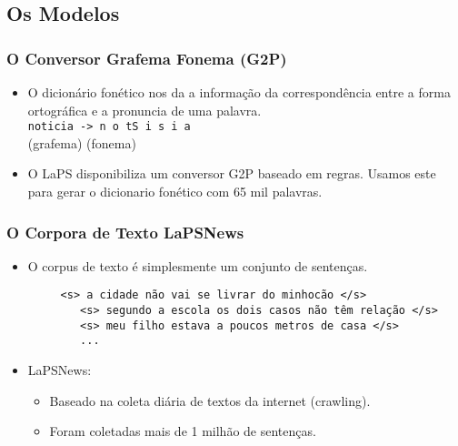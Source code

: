 \documentclass{beamer}
\begin{document}
\subsection{Os Modelos}
\begin{frame}
   \frametitle{O Conversor Grafema Fonema (G2P)}
   \begin{itemize}
      \item O dicionário fonético nos da a informação da correspondência
      entre a forma ortográfica e a pronuncia de uma palavra.\\
      {\centering \Large \texttt{noticia ->  n o tS i s i a}\\}
      \hspace{40pt} (grafema) \hspace{65pt} (fonema)\\[5pt]
   \end{itemize}
   \begin{itemize}
      \pause
      \item O LaPS disponibiliza um conversor G2P baseado em regras. Usamos
      este para gerar o dicionario fonético com 65 mil palavras.
   \end{itemize}
\end{frame}


\begin{frame}[fragile]
   \frametitle{O Corpora de Texto LaPSNews}
   \begin{itemize}
      \item O corpus de texto é simplesmente um conjunto de sentenças.
      {\footnotesize
	 \begin{verbatim}
	 <s> a cidade não vai se livrar do minhocão </s>
	    <s> segundo a escola os dois casos não têm relação </s>
	    <s> meu filho estava a poucos metros de casa </s>
	    ...
	    \end{verbatim}
      }
      \pause
      \item LaPSNews:
      \begin{itemize}
	 \item Baseado na coleta diária de textos da internet (crawling).
	 \item Foram coletadas mais de 1 milhão de sentenças.
      \end{itemize}
   \end{itemize}
\end{frame}
\end{document}
